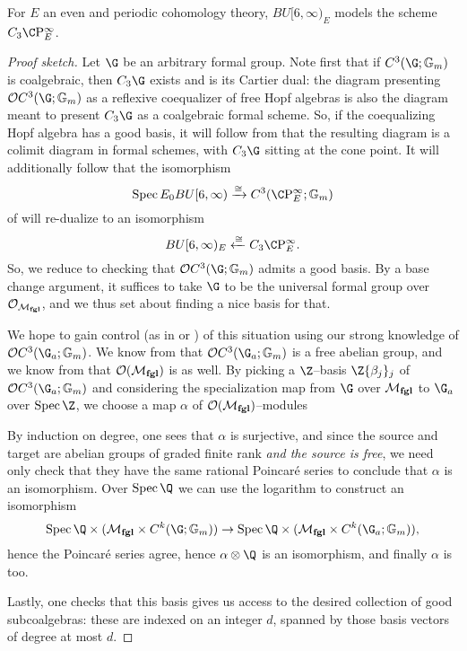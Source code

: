 \begin{theorem}
For $E$ an even and periodic cohomology theory, $BU[6, \infty)_E$ models the scheme $C_3 \CP^\infty_E$.
\end{theorem}
\begin{proof}[Proof sketch]
Let $\G$ be an arbitrary formal group.  Note first that if $C^3(\G; \Gm)$ is coalgebraic, then $C_3 \G$ exists and is its Cartier dual: the diagram presenting $\sheaf OC^3(\G; \Gm)$ as a reflexive coequalizer of free Hopf algebras is also the diagram meant to present $C_3 \G$ as a coalgebraic formal scheme.  So, if the coequalizing Hopf algebra has a good basis, it will follow from  that the resulting diagram is a colimit diagram in formal schemes, with $C_3 \G$ sitting at the cone point.  It will additionally follow that the isomorphism \[\Spec E_0 BU[6, \infty) \xrightarrow{\cong} C^3(\CP^\infty_E; \Gm)\] of  will re-dualize to an isomorphism \[BU[6, \infty)_E \xleftarrow{\cong} C_3 \CP^\infty_E.\]  So, we reduce to checking that $\sheaf O C^3(\G; \Gm)$ admits a good basis.  By a base change argument, it suffices to take $\G$ to be the universal formal group over $\mathcal{O}_{\mathcal{M}_{\mathbf{fgl}}}$, and we thus set about finding a nice basis for that.

We hope to gain control (as in  or ) of this situation using our strong knowledge of $\sheaf O C^3(\G_a; \Gm)$.  We know from  that $\sheaf O C^3(\G_a; \Gm)$ is a free abelian group, and we know from  that $\mathcal{O}(\mathcal{M}_{\mathbf{fgl}})$ is as well.  By picking a $\Z$--basis $\Z\{\beta_j\}_j$ of $\sheaf O C^3(\G_a; \Gm)$ and considering the specialization map from $\G$ over $\mathcal{M}_{\mathbf{fgl}}$ to $\G_a$ over $\Spec \Z$, we choose a map $\alpha$ of $\mathcal{O}(\mathcal{M}_{\mathbf{fgl}})$--modules
\begin{center}
\end{center}
By induction on degree, one sees that $\alpha$ is surjective, and since the source and target are abelian groups of graded finite rank \emph{and the source is free}, we need only check that they have the same rational Poincar\'e series to conclude that $\alpha$ is an isomorphism.  Over $\Spec \Q$ we can use the logarithm to construct an isomorphism \[\Spec \Q \times (\moduli{fgl} \times C^k(\G; \Gm)) \to \Spec \Q \times (\moduli{fgl} \times C^k(\G_a; \Gm)),\] hence the Poincar\'e series agree, hence $\alpha \otimes \Q$ is an isomorphism, and finally $\alpha$ is too.

Lastly, one checks that this basis gives us access to the desired collection of good subcoalgebras: these are indexed on an integer $d$, spanned by those basis vectors of degree at most $d$.
\end{proof}
